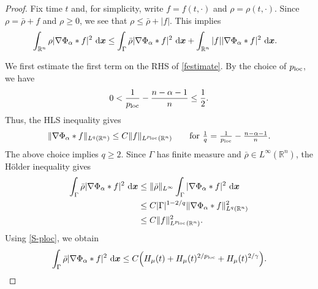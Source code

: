 \documentclass[reqno,11pt]{amsart}
\numberwithin{equation}{section}
\theoremstyle{definition}
\def\dd{{\, \rm d}}
\begin{document}
\begin{proof}

Fix time $t$ and, for simplicity, write
$f=f(t,\cdot)$ and $\rho=\rho(t,\cdot)$. Since $\rho=\bar\rho+f$ and $\rho\ge0$, we see that $\rho\le \bar\rho+|f|.$
This implies
\begin{equation}\label{festimate}
\begin{aligned} \int_{\mathbb R^n}\rho|\nabla\Phi_\alpha*f|^2\,\dd\boldsymbol{x}  &\le \int_\Gamma\bar\rho|\nabla\Phi_\alpha*f|^2\,\dd\boldsymbol{x} + \int_{\mathbb R^n}|f||\nabla\Phi_\alpha*f|^2\,\dd\boldsymbol{x}.
\end{aligned}
\end{equation}

We first estimate the first term on the RHS of \eqref{festimate}.  By the choice of
$p_{\rm loc}$, we have
\[ 0<\frac1{p_{\rm loc}}-\frac{n-\alpha-1}{n} \le  \frac12 .
\]
Thus, the HLS inequality gives
\[ \|\nabla\Phi_\alpha*f\|_{L^q(\mathbb R^n)}  \le C\|f\|_{L^{p_{\rm loc}}(\mathbb R^n)}  \qquad \mbox{for $\frac1q
 = \frac1{p_{\rm loc}}-\frac{n-\alpha-1}{n}$}.
\]
The above choice implies $q\ge2$.  Since $\Gamma$ has finite measure and
$\bar\rho\in L^\infty(\mathbb R^n)$, the H\"older inequality gives
\[
\begin{aligned}
 \int_\Gamma\bar\rho|\nabla\Phi_\alpha*f|^2\,\dd\boldsymbol{x}
  &\le \|\bar\rho\|_{L^\infty}\int_\Gamma|\nabla\Phi_\alpha*f|^2\,\dd\boldsymbol{x}          \\
 &\le C |\Gamma|^{1-2/q}
   \|\nabla\Phi_\alpha*f\|_{L^q(\mathbb R^n)}^2          \\
  &\le  C\|f\|_{L^{p_{\rm loc}}(\mathbb R^n)}^2 .
\end{aligned}
\]
Using \eqref{S-ploc}, we obtain
\begin{equation}\label{fbarestimate}
  \int_\Gamma\bar\rho|\nabla\Phi_\alpha*f|^2\,\dd\boldsymbol{x}  \le  C\Big( H_\mu(t)
  +  H_\mu(t)^{2/p_{\rm loc}}  +  H_\mu(t)^{2/\gamma}  \Big).
\end{equation}


\end{proof}
\end{document}
